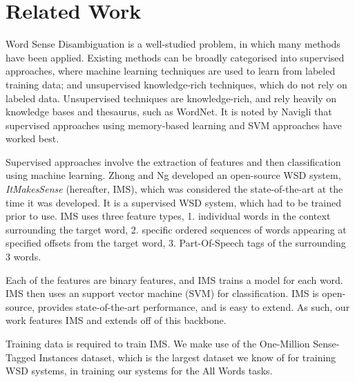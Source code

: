 \section{Related Work}

Word Sense Disambiguation is a well-studied problem, in which many
methods have been applied. Existing methods can be broadly categorised
into supervised approaches, where machine learning techniques are used
to learn from labeled training data; and unsupervised knowledge-rich
techniques, which do not rely on labeled data. Unsupervised techniques
are knowledge-rich, and rely heavily on knowledge bases and thesaurus,
such as WordNet. It is noted by Navigli 
that supervised approaches using memory-based learning and SVM
approaches have worked best.

Supervised approaches involve the extraction of features and then
classification using machine learning. Zhong and Ng
 developed an open-source WSD system, {\it
  ItMakesSense} (hereafter, IMS), which was considered the
state-of-the-art at the time it was developed.  It is a supervised WSD
system, which had to be trained prior to use. IMS uses three feature
types, 1. individual words in the context surrounding the target word,
2. specific ordered sequences of words appearing at specified offsets
from the target word, 3. Part-Of-Speech tags of the surrounding 3
words.

Each of the features are binary features, and IMS trains a model for
each word. IMS then uses an support vector machine (SVM) for
classification. IMS is open-source, provides state-of-the-art
performance, and is easy to extend. As such, our work features IMS and
extends off of this backbone.

Training data is required to train IMS.  We make use of the
One-Million Sense-Tagged Instances \cite{taghipour2015one} dataset,
which is the largest dataset we know of for training WSD systems, in
training our systems for the All Words tasks.

